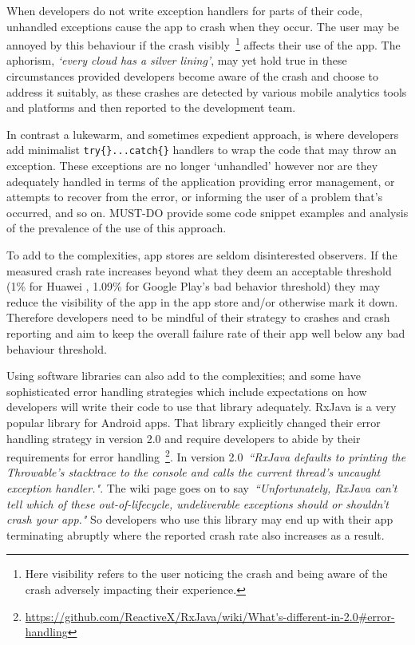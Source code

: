 When developers do not write exception handlers for parts of their code, unhandled exceptions cause the app to crash when they occur. The user may be annoyed by this behaviour if the crash visibly~\footnote{Here visibility refers to the user noticing the crash and being aware of the crash adversely impacting their experience.}  affects their use of the app. The aphorism, \emph{`every cloud has a silver lining'}, may yet hold true in these circumstances provided developers become aware of the crash and choose to address it suitably, as these crashes are detected by various mobile analytics tools and platforms and then reported to the development team.

In contrast a lukewarm, and sometimes expedient approach, is where developers add minimalist \texttt{try\{\}...catch\{\}} handlers to wrap the code that may throw an exception. These exceptions are no longer `unhandled' however nor are they adequately handled in terms of the application providing error management, or attempts to recover from the error, or informing the user of a problem that's occurred, and so on. MUST-DO provide some code snippet examples and analysis of the prevalence of the use of this approach.

To add to the complexities, app stores are seldom disinterested observers. If the measured crash rate increases beyond what they deem an acceptable threshold (1\% for Huawei %
, 1.09\% for Google Play's bad behavior threshold) they may reduce the visibility of the app in the app store and/or otherwise mark it down. Therefore developers need to be mindful of their strategy to crashes and crash reporting and aim to keep the overall failure rate of their app well below any bad behaviour threshold.

Using software libraries can also add to the complexities; and some have sophisticated error handling strategies which include expectations on how developers will write their code to use that library adequately. RxJava is a very popular library for Android apps. That library explicitly changed their error handling strategy in version 2.0 and require developers to abide by their requirements for error handling~\footnote{\url{https://github.com/ReactiveX/RxJava/wiki/What's-different-in-2.0\#error-handling}}. In version 2.0~\emph{``RxJava defaults to printing the Throwable's stacktrace to the console and calls the current thread's uncaught exception handler."}. The wiki page goes on to say~\emph{``Unfortunately, RxJava can't tell which of these out-of-lifecycle, undeliverable exceptions should or shouldn't crash your app."} So developers who use this library may end up with their app terminating abruptly where the reported crash rate also increases as a result.

